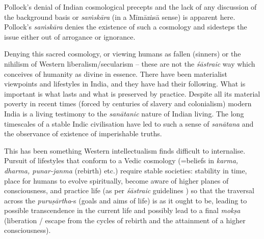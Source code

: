 Pollock's denial of Indian cosmological precepts and the lack of any discussion of the background basis or {\sl saṁskāra} (in a Mīmāṁsā sense) is apparent here. Pollock's {\sl saṁskāra} denies the existence of such a cosmology and sidesteps the issue either out of arrogance or ignorance.

Denying this sacred cosmology, or viewing humans as fallen (sinners) or the nihilism of Western liberalism/secularism -- these are not the {\sl śāstraic} way which conceives of humanity as divine in essence. There have been materialist viewpoints and lifestyles in India, and they have had their following. What is important is what lasts and what is preserved by practice. Despite all its material poverty in recent times (forced by centuries of slavery and colonialism) modern India is a living testimony to the {\sl sanātanic} nature of Indian living. The long timescales of a stable Indic civilisation have led to such a sense of {\sl sanātana} and the observance of existence of imperishable truths.

This has been something Western intellectualism finds difficult to internalise. Pursuit of lifestyles that conform to a Vedic cosmology (=beliefs in {\sl karma, dharma, punar-janma} (rebirth) etc.) require stable societies: stability in time, place for humans to evolve spiritually, become aware of higher planes of consciousness, and practice life (as per {\sl śāstraic} guidelines ) so that the traversal across the {\sl puruṣārtha}-s (goals and aims of life) is as it ought to be, leading to  possible transcendence in the current life and possibly lead to a final {\sl mokṣa}  (liberation / escape from the cycles of rebirth and the attainment of a higher consciousness).

